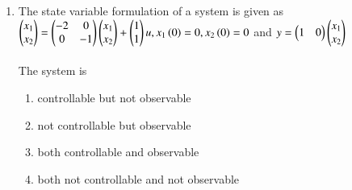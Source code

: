 \documentclass[journal]{IEEEtran}
\begin{document}
\begin{enumerate}
{\begin{figure}[H]
\label{fig:my_label}
\end{figure}
The Peak-to-Peak source current ripple in Amps is
\begin{multicols}{4}
\begin{enumerate}
\item $0.96$
\item $0.144$
\item $0.192$ 
\item $0.288$
\end{enumerate}
\end{multicols}
}
\item{
The state variable formulation of a system is given as\\
$\begin{pmatrix}x_1\\x_2\end{pmatrix}=\begin{pmatrix}-2&0\\0&-1\end{pmatrix}\begin{pmatrix}x_1\\x_2\end{pmatrix}+\begin{pmatrix}1\\1\end{pmatrix}u, x_1\left(0\right)=0,x_2\left(0\right)=0$ and $y=\begin{pmatrix}1&0\end{pmatrix}\begin{pmatrix}x_1\\x_2\end{pmatrix}$\\\\
The system is

\begin{enumerate}
\item controllable but not observable
\item not controllable but observable
\item both controllable and observable
\item both not controllable and not observable
\end{enumerate}

}
\end{enumerate}
\end{document}
